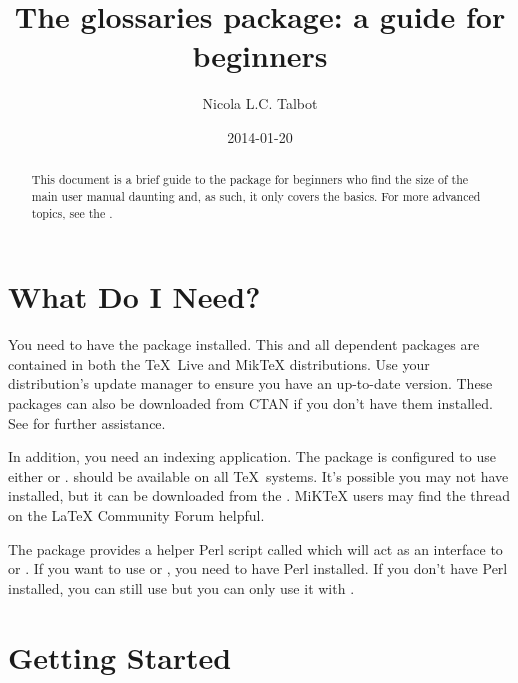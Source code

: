 \documentclass{nlctdoc}
\title{The glossaries package: a guide for beginners}
\author{Nicola L.C. Talbot}
\date{2014-01-20}
\begin{document}
\maketitle

\begin{abstract}
This document is a brief guide to the  package for
beginners who find the size of the main user manual daunting and, as
such, it only covers the basics. For more advanced topics, see the
.
\end{abstract}

\tableofcontents

\section{What Do I Need?}
\label{requirements}

You need to have the  package installed. This and
all dependent packages are contained in both the TeX~Live and MikTeX
distributions.  Use your distribution's update manager to ensure you
have an up-to-date version. These packages can also be downloaded
from CTAN if you don't have them installed. See
 for further assistance.

In addition, you need an indexing application. The 
package is configured to use either  or .
 should be available on all \TeX\ systems. It's
possible you may not have  installed, but it can be
downloaded from the . MiKTeX users may find the
 thread on the LaTeX Community Forum helpful.

The  package provides a helper Perl script
called  which will act as an interface to
 or . If you want to use
 or , you need to have Perl
installed. If you don't have Perl installed, you can still use
 but you can only use it with .

\section{Getting Started}
\label{start}
\end{document}
